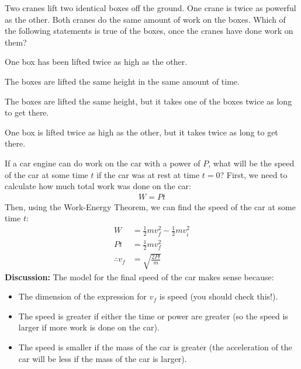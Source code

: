 \begin{checkpoint}
\begin{MCquestion}
{Two cranes lift two identical boxes off the ground. One crane is twice as powerful as the other. Both cranes do the same amount of work on the boxes. Which of the following statements is true of the boxes, once the cranes have done work on them?}
\item One box has been lifted twice as high as the other.
\item The boxes are lifted the same height in the same amount of time.
\item The boxes are lifted the same height, but it takes one of the boxes twice as long to get there. %
\item One box is lifted twice as high as the other, but it takes twice as long to get there. 
\end{MCquestion}
\end{checkpoint}
\newpage
\begin{example}{If a car engine can do work on the car with a power of $P$, what will be the speed of the car at some time $t$ if the car was at rest at time $t=0$?}
First, we need to calculate how much total work was done on the car:
\begin{align*}
W = P t
\end{align*}
Then, using the Work-Energy Theorem, we can find the speed of the car at some time $t$:
\begin{align*}
W &= \frac{1}{2}mv_f^2 - \frac{1}{2}mv_i^2\\
Pt &= \frac{1}{2}mv_f^2 \\
\therefore v_f &= \sqrt{\frac{2Pt}{m}}
\end{align*}
\textbf{Discussion:} The model for the final speed of the car makes sense because:
\begin{itemize}
\item The dimension of the expression for $v_f$ is speed (you should check this!).
\item The speed is greater if either the time or power are greater (so the speed is larger if more work is done on the car).
\item The speed is smaller if the mass of the car is greater (the acceleration of the car will be less if the mass of the car is larger).
\end{itemize}
\end{example}

